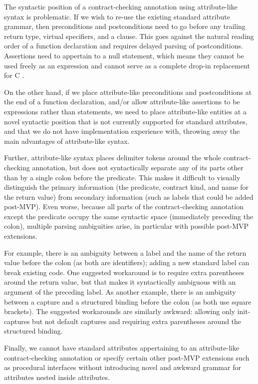 The syntactic position of a contract-checking annotation using attribute-like syntax is problematic. If we wish to re-use the existing standard attribute grammar, then preconditions and postconditions need to go before any trailing return type, virtual specifiers, and a  clause. This goes against the natural reading order of a function declaration and requires delayed parsing of postconditions. Assertions need to appertain to a null statement, which means they cannot be used freely as an expression and cannot serve as a complete drop-in replacement for C .

On the other hand, if we place attribute-like preconditions and postconditions at the end of a function declaration, and/or allow attribute-like assertions to be expressions rather than statements, we need to place attribute-like entities at a novel syntactic position that is not currently supported for standard attributes, and that we do not have implementation experience with, throwing away the main advantages of attribute-like syntax.

Further, attribute-like syntax places delimiter tokens around the whole contract-checking annotation, but does not syntactically separate any of its parts other than by a single colon before the predicate. This makes it difficult to visually distinguish the primary information (the predicate, contract kind, and name for the return value) from secondary information (such as labels that could be added post-MVP). Even worse, because all parts of the contract-checking annotation except the predicate occupy the same syntactic space (immediately preceding the colon), multiple parsing ambiguities arise, in particular with possible post-MVP extensions.

For example, there is an ambiguity between a label and the name of the return value before the colon (as both are identifiers); adding a new standard label can break existing code. One suggested workaround is to require extra parentheses around the return value, but that makes it syntactically ambiguous with an argument of the preceding label. As another example, there is an ambiguity between a capture and a structured binding before the colon (as both use square brackets). The suggested workarounds are similarly awkward: allowing only init-captures but not default captures and requiring extra parentheses around the structured binding. 

Finally, we cannot have standard attributes appertaining to an attribute-like contract-checking annotation or specify certain other post-MVP extensions such as procedural interfaces without introducing novel and awkward grammar for attributes nested inside attributes.

